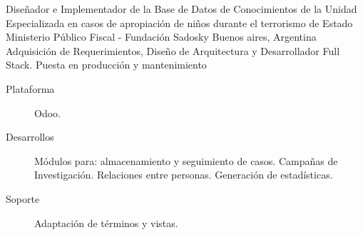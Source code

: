 	{Diseñador e Implementador de la Base de Datos de Conocimientos de la Unidad Especializada en casos de apropiación de niños durante el terrorismo de Estado}
	{Ministerio Público Fiscal - Fundación Sadosky}
	{Buenos aires, Argentina}
	{Adquisición de Requerimientos, Diseño de Arquitectura y Desarrollador Full Stack. Puesta en producción y mantenimiento} 
	{\begin{description}
	\item [Plataforma] Odoo.
	\item [Desarrollos] Módulos para: almacenamiento y seguimiento de casos. Campañas de Investigación. Relaciones entre personas. Generación de estadísticas.
	\item [Soporte] Adaptación de términos y vistas.
	\end{description}}

